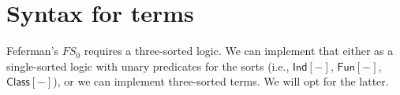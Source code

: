 
\section{Syntax for terms}

\begin{node}
Feferman's $FS_{0}$ requires a three-sorted logic. We can implement
that either as a single-sorted logic with unary predicates for the
sorts (i.e., $\textsf{Ind}[-]$, $\textsf{Fun}[-]$, $\textsf{Class}[-]$),
or we can implement three-sorted terms. We will opt for the latter.


\end{node}
